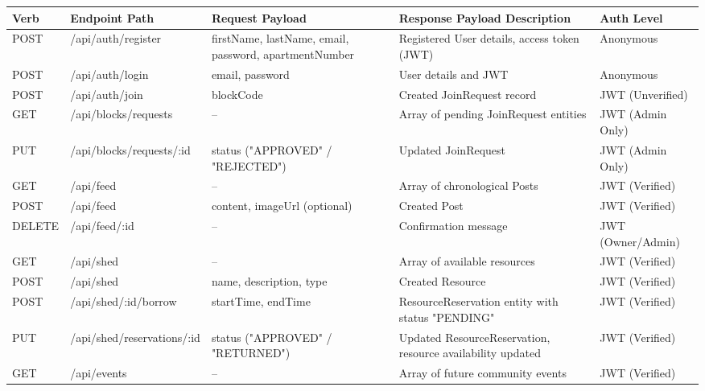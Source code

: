 \begin{table}[htbp]
\centering
\scriptsize
\setlength{\tabcolsep}{3pt}
\begin{tabularx}{\textwidth}{|>{\ttfamily\raggedright\arraybackslash}p{1.2cm}|>{\ttfamily\raggedright\arraybackslash}X|>{\raggedright\arraybackslash}p{3.0cm}|>{\raggedright\arraybackslash}X|>{\raggedright\arraybackslash}p{1.8cm}|}
\hline
\textbf{Verb} & \textbf{Endpoint Path} & \textbf{Request Payload} & \textbf{Response Payload Description} & \textbf{Auth Level} \\ \hline
POST & /api/\allowbreak auth/\allowbreak register & firstName, lastName, email, password, apartmentNumber & Registered User details, access token (JWT) & Anonymous \\ \hline
POST & /api/\allowbreak auth/\allowbreak login & email, password & User details and JWT & Anonymous \\ \hline
POST & /api/\allowbreak auth/\allowbreak join & blockCode & Created JoinRequest record & JWT (Unverified) \\ \hline
GET & /api/\allowbreak blocks/\allowbreak requests & -- & Array of pending JoinRequest entities & JWT (Admin Only) \\ \hline
PUT & /api/\allowbreak blocks/\allowbreak requests/\allowbreak :id & status ("APPROVED" / "REJECTED") & Updated JoinRequest & JWT (Admin Only) \\ \hline
GET & /api/\allowbreak feed & -- & Array of chronological Posts & JWT (Verified) \\ \hline
POST & /api/\allowbreak feed & content, imageUrl (optional) & Created Post & JWT (Verified) \\ \hline
DELETE & /api/\allowbreak feed/\allowbreak :id & -- & Confirmation message & JWT (Owner/Admin) \\ \hline
GET & /api/\allowbreak shed & -- & Array of available resources & JWT (Verified) \\ \hline
POST & /api/\allowbreak shed & name, description, type & Created Resource & JWT (Verified) \\ \hline
POST & /api/\allowbreak shed/\allowbreak :id/\allowbreak borrow & startTime, endTime & ResourceReservation entity with status "PENDING" & JWT (Verified) \\ \hline
PUT & /api/\allowbreak shed/\allowbreak reservations/\allowbreak :id & status ("APPROVED" / "RETURNED") & Updated ResourceReservation, resource availability updated & JWT (Verified) \\ \hline
GET & /api/\allowbreak events & -- & Array of future community events & JWT (Verified) \\ \hline

\end{tabularx}
\end{table}
